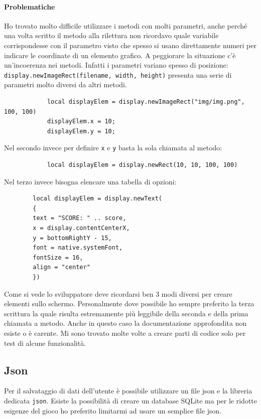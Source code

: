 		\paragraph{Problematiche}
		Ho trovato molto difficile utilizzare i metodi con molti parametri, anche perché una volta scritto il metodo alla rilettura non ricordavo quale variabile corrispondesse con il parametro visto che spesso si usano direttamente numeri per indicare le coordinate di un elemento grafico. A peggiorare la situazione c'è un'incoerenza nei metodi. Infatti i parametri variano spesso di posizione: \verb|display.newImageRect(filename, width, height)| presenta una serie di parametri molto diversi da altri metodi.
		\begin{verbatim}
			local displayElem = display.newImageRect("img/img.png", 100, 100)
			displayElem.x = 10;
			displayElem.y = 10;
		\end{verbatim}
		
		Nel secondo invece per definire \verb|x| e \verb|y| basta la sola chiamata al metodo:
	
		\begin{verbatim}
			local displayElem = display.newRect(10, 10, 100, 100)
		\end{verbatim}
		
		Nel terzo invece bisogna elencare una tabella di opzioni:
		
		\begin{verbatim}
		local displayElem = display.newText(
		{
		text = "SCORE: " .. score,
		x = display.contentCenterX,
		y = bottomRightY - 15,
		font = native.systemFont,
		fontSize = 16,
		align = "center"
		})
		\end{verbatim}
		
		Come si vede lo sviluppatore deve ricordarsi ben 3 modi diversi per creare elementi sullo schermo. Personalmente dove possibile ho sempre preferito la terza scrittura la quale risulta estremamente più leggibile della seconda e della prima chiamata a metodo.
		Anche in questo caso la documentazione approfondita non esiste o è carente. Mi sono trovato molte volte a creare parti di codice solo per test di alcune funzionalità.
		
		
	\subsection{Json}
		Per il salvataggio di dati dell'utente è possibile utilizzare un file json e la libreria dedicata \verb|json|. Esiste la possibilità di creare un database SQLite ma per le ridotte esigenze del gioco ho preferito limitarmi ad usare un semplice file json.
		
